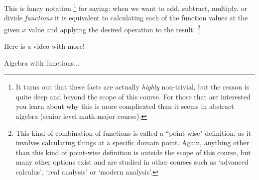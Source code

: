 \documentclass{ximera}
\begin{document}
    This is fancy notation%
    \footnote{%
        It turns out that these facts are actually \textit{highly} non-trivial, but the reason is quite deep and beyond the scope of this course. For those that are interested you learn about why this is more complicated than it seems in abstract algebra (senior level math-major course).%
        }
    for saying: when we want to add, subtract, multiply, or divide \textit{functions} it is equivalent to calculating each of the function values at the given $x$ value and applying the desired operation to the result.%
    \footnote{%
        This kind of combination of functions is called a ``point-wise" definition, as it involves calculating things at a specific domain point. Again, anything other than this kind of point-wise definition is outside the scope of this course, but many other options exist and are studied in other courses such as `advanced calculus', `real analysis' or `modern analysis'.%
        }
        
    Here is a video with more!
    
        
        
    \begin{problem}
        Algebra with functions...
        \begin{multipleChoice}
        \end{multipleChoice}
    \end{problem}
\end{document}
